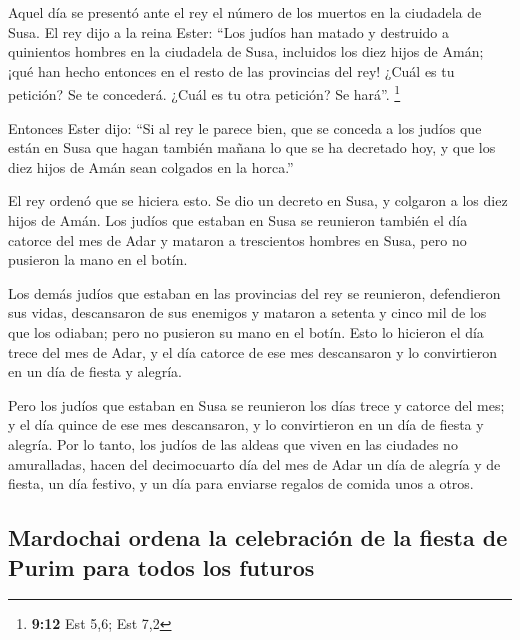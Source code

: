  Aquel día se presentó ante el rey el número de los
muertos en la ciudadela de Susa.  El rey dijo a la reina
Ester: ``Los judíos han matado y destruido a quinientos hombres en la
ciudadela de Susa, incluidos los diez hijos de Amán; ¡qué han hecho
entonces en el resto de las provincias del rey! ¿Cuál es tu petición? Se
te concederá. ¿Cuál es tu otra petición? Se hará''. \footnote{\textbf{9:12}
  Est 5,6; Est 7,2}

 Entonces Ester dijo: ``Si al rey le parece bien, que se
conceda a los judíos que están en Susa que hagan también mañana lo que
se ha decretado hoy, y que los diez hijos de Amán sean colgados en la
horca.''

 El rey ordenó que se hiciera esto. Se dio un decreto en
Susa, y colgaron a los diez hijos de Amán.  Los judíos
que estaban en Susa se reunieron también el día catorce del mes de Adar
y mataron a trescientos hombres en Susa, pero no pusieron la mano en el
botín.

 Los demás judíos que estaban en las provincias del rey
se reunieron, defendieron sus vidas, descansaron de sus enemigos y
mataron a setenta y cinco mil de los que los odiaban; pero no pusieron
su mano en el botín.  Esto lo hicieron el día trece del
mes de Adar, y el día catorce de ese mes descansaron y lo convirtieron
en un día de fiesta y alegría.

 Pero los judíos que estaban en Susa se reunieron los
días trece y catorce del mes; y el día quince de ese mes descansaron, y
lo convirtieron en un día de fiesta y alegría.  Por lo
tanto, los judíos de las aldeas que viven en las ciudades no
amuralladas, hacen del decimocuarto día del mes de Adar un día de
alegría y de fiesta, un día festivo, y un día para enviarse regalos de
comida unos a otros.

\hypertarget{mardochai-ordena-la-celebraciuxf3n-de-la-fiesta-de-purim-para-todos-los-futuros}{%
\subsection{Mardochai ordena la celebración de la fiesta de Purim para
todos los
futuros}\label{mardochai-ordena-la-celebraciuxf3n-de-la-fiesta-de-purim-para-todos-los-futuros}}


